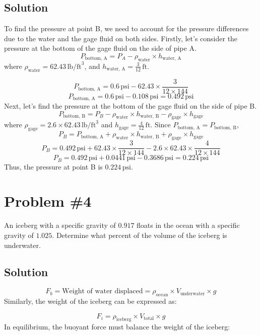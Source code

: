 \documentclass[12pt]{article}
\begin{document}
\subsection*{Solution}
To find the pressure at point B, we need to account for the pressure differences due to the water and the gage fluid on both sides.
\newline\newline
Firstly, let's consider the pressure at the bottom of the gage fluid on the side of pipe A.
\[
P_{\text{bottom, A}} = P_A - \rho_{\text{water}} \times h_{\text{water, A}}
\]
where \( \rho_{\text{water}} = 62.43 \, \text{lb/ft}^3 \), and \( h_{\text{water, A}} = \frac{3}{12} \, \text{ft} \).

\[
P_{\text{bottom, A}} = 0.6 \, \text{psi} - 62.43 \times \frac{3}{12 \times 144}
\]
\[
P_{\text{bottom, A}} = 0.6 \, \text{psi} - 0.108 \, \text{psi} = 0.492 \, \text{psi}
\]
Next, let's find the pressure at the bottom of the gage fluid on the side of pipe B.
\[
P_{\text{bottom, B}} = P_B - \rho_{\text{water}} \times h_{\text{water, B}} - \rho_{\text{gage}} \times h_{\text{gage}}
\]
where \( \rho_{\text{gage}} = 2.6 \times 62.43 \, \text{lb/ft}^3 \) and \( h_{\text{gage}} = \frac{4}{12} \, \text{ft} \).
Since \( P_{\text{bottom, A}} = P_{\text{bottom, B}} \),
\[
P_B = P_{\text{bottom, A}} + \rho_{\text{water}} \times h_{\text{water, B}} + \rho_{\text{gage}} \times h_{\text{gage}}
\]
\[
P_B = 0.492 \, \text{psi} + 62.43 \times \frac{3}{12 \times 144} - 2.6 \times 62.43 \times \frac{4}{12 \times 144}
\]
\[
P_B = 0.492 \, \text{psi} + 0.0441 \, \text{psi} - 0.3686 \, \text{psi} = 0.224 \, \text{psi}
\]
Thus, the pressure at point B is \(0.224 \, \text{psi}\).

\newpage
\section*{Problem \#4}
An iceberg with a specific gravity of \(0.917\) floats in the ocean with a specific gravity of \(1.025\). Determine what percent of the volume of the iceberg is underwater.

\subsection*{Solution}

\[
F_b = \text{Weight of water displaced} = \rho_{\text{ocean}} \times V_{\text{underwater}} \times g
\]
Similarly, the weight of the iceberg can be expressed as:

\[
F_i = \rho_{\text{iceberg}} \times V_{\text{total}} \times g
\]
In equilibrium, the buoyant force must balance the weight of the iceberg:
\end{document}
